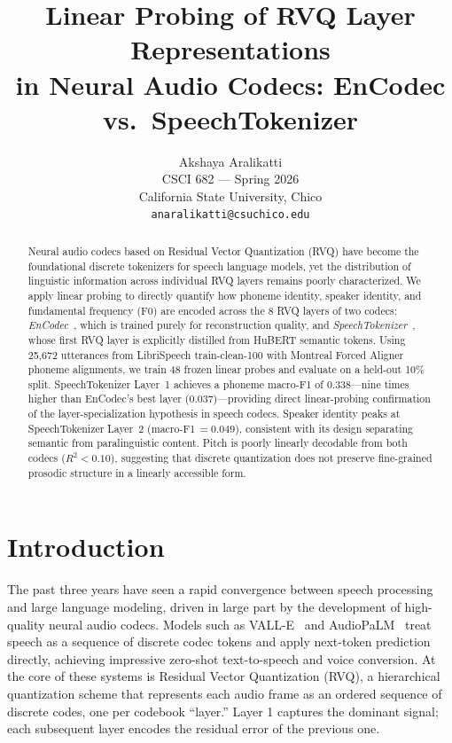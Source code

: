 \documentclass[10pt,twocolumn]{article}
\title{\large\textbf{Linear Probing of RVQ Layer Representations\\
       in Neural Audio Codecs: EnCodec vs.\ SpeechTokenizer}}
\author{
  Akshaya Aralikatti \\
  CSCI 682 --- Spring 2026 \\
  California State University, Chico \\
  \texttt{anaralikatti@csuchico.edu}
}
\date{}
\begin{document}
\maketitle

\begin{abstract}
Neural audio codecs based on Residual Vector Quantization (RVQ) have
become the foundational discrete tokenizers for speech language models,
yet the distribution of linguistic information across individual RVQ
layers remains poorly characterized. We apply linear probing to directly
quantify how phoneme identity, speaker identity, and fundamental
frequency (F0) are encoded across the 8 RVQ layers of two codecs:
\emph{EnCodec}~\cite{defossez2023}, which is trained purely for
reconstruction quality, and \emph{SpeechTokenizer}~\cite{zhang2024},
whose first RVQ layer is explicitly distilled from HuBERT semantic
tokens. Using 25,672 utterances from LibriSpeech train-clean-100 with
Montreal Forced Aligner phoneme alignments, we train 48 frozen linear
probes and evaluate on a held-out 10\% split. SpeechTokenizer Layer~1
achieves a phoneme macro-F1 of 0.338---nine times higher than EnCodec's
best layer (0.037)---providing direct linear-probing confirmation of the
layer-specialization hypothesis in speech codecs. Speaker identity peaks
at SpeechTokenizer Layer~2 (macro-F1\,$=\!0.049$), consistent with its
design separating semantic from paralinguistic content. Pitch is poorly
linearly decodable from both codecs ($R^2 < 0.10$), suggesting that
discrete quantization does not preserve fine-grained prosodic structure
in a linearly accessible form.
\end{abstract}

\section{Introduction}

The past three years have seen a rapid convergence between speech
processing and large language modeling, driven in large part by the
development of high-quality neural audio codecs. Models such as
VALL-E~\cite{wang2023} and AudioPaLM~\cite{rubenstein2023} treat speech
as a sequence of discrete codec tokens and apply next-token prediction
directly, achieving impressive zero-shot text-to-speech and voice
conversion. At the core of these systems is Residual Vector
Quantization (RVQ), a hierarchical quantization scheme that
represents each audio frame as an ordered sequence of discrete codes,
one per codebook ``layer.'' Layer 1 captures the dominant signal; each
subsequent layer encodes the residual error of the previous one.
\end{document}
